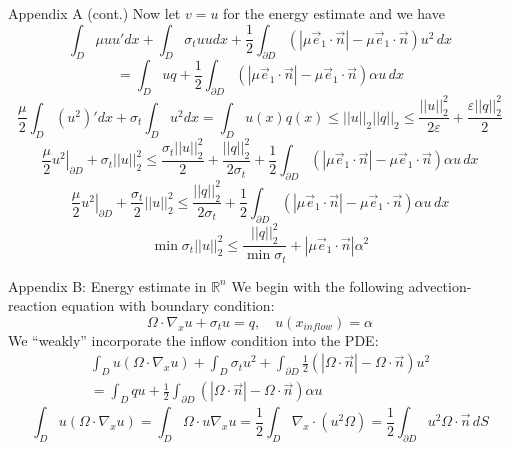 \documentclass{beamer}
\newcommand{\R}{{\mathbb R}}
\newcommand{\lt}{\left}
\newcommand{\rt}{\right}
\newcommand{\eps}{\varepsilon}
\theoremstyle{plain}
\theoremstyle{definition}
\begin{document}
\begin{frame}{Appendix A (cont.)}
Now let $v = u$ for the energy estimate and we have  
\[\int_D \mu u u' dx + \int_D \sigma_t uu dx +\frac{1}{2}\int_{\partial D}(|\mu\vec e_1 \cdot \vec n|-\mu\vec e_1 \cdot \vec n)u^2\, dx\]  
\[=\int_D uq+\frac{1}{2}\int_{\partial D}(|\mu\vec e_1 \cdot \vec n|-\mu\vec e_1 \cdot \vec n)\alpha u \, dx\]
\[\frac{\mu}{2}\int_D (u^2)'   dx +  \sigma_t\int_D u^2 dx = \int_D u(x)q(x) \leq ||u||_2 ||q||_2 \leq \frac{||u||_2^2}{2\eps} + \frac{\eps||q||_2^2}{2}\]
\[
\frac{\mu }{2}\lt.u^2\rt|_{\partial D}+ \sigma_t||u||_2^2  \leq \frac{\sigma_t||u||_2^2}{2} + \frac{||q||_2^2}{2\sigma_{t}} + \frac{1}{2}\int_{\partial D}(|\mu\vec e_1 \cdot \vec n|-\mu\vec e_1 \cdot \vec n)\alpha u \, dx 
\]
\[
\frac{\mu }{2}\lt.u^2\rt|_{\partial D}+ \frac{\sigma_t}{2}||u||_2^2  \leq  \frac{||q||_2^2}{2\sigma_{t}} + \frac{1}{2}\int_{\partial D}(|\mu\vec e_1 \cdot \vec n|-\mu\vec e_1 \cdot \vec n)\alpha u \, dx 
\]
\[\min  \sigma_t ||u||_2^2 \leq \frac{||q||_2^2}{ \min \sigma_t}+  |\mu\vec e_1\cdot \vec n|\alpha^2\]
\end{frame}

\begin{frame}{Appendix B: Energy estimate in $\R^n$}
We begin with the following advection-reaction equation with boundary condition: 
\[
\Omega \cdot \nabla_x u + \sigma_t u = q, \quad u(x_{inflow}) = \alpha
\]
We ``weakly'' incorporate the inflow condition into the PDE:
\begin{align*}
   \int_D u(\Omega \cdot \nabla_x u)+ \int_D \sigma_t u^2 + \int_{\partial D} \frac{1}{2}(|\Omega \cdot \vec n|- \Omega \cdot \vec n) u^2 \\
   = \int_D qu + \frac{1}{2}\int_{\partial D}(|\Omega \cdot \vec n|-  \Omega \cdot \vec n)\alpha  u
\end{align*}
\[
\int_D u(\Omega \cdot \nabla_x u) = \int_D \Omega \cdot u \nabla_x u =  \frac{1}{2}\int_D  \nabla_x\cdot (u^2\Omega) = \frac{1}{2} \int_{\partial D} u^2 \Omega \cdot \vec n \, dS
\]
\end{frame}
\end{document}
